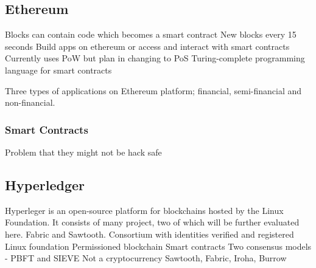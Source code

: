 \subsection{Ethereum}
Blocks can contain code which becomes a smart contract
New blocks every 15 seconds
Build apps on ethereum or access and interact with smart contracts 
Currently uses PoW but plan in changing to PoS
Turing-complete programming language for smart contracts

Three types of applications on Ethereum platform; financial, semi-financial and non-financial. 

\subsubsection*{Smart Contracts}
Problem that they might not be hack safe 

\subsection{Hyperledger}
Hyperleger is an open-source platform for blockchains hosted by the Linux Foundation. It consists of many project, two of which will be further evaluated here. Fabric and Sawtooth. 
Consortium with identities verified and registered
Linux foundation
Permissioned blockchain
Smart contracts
Two consensus models - PBFT and SIEVE
Not a cryptocurrency 
Sawtooth, Fabric, Iroha, Burrow



